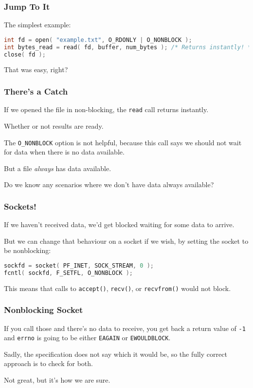 \begin{frame}[fragile]
	\frametitle{Jump To It}

	The simplest example:

	\begin{lstlisting}[language=C]
int fd = open( "example.txt", O_RDONLY | O_NONBLOCK );
int bytes_read = read( fd, buffer, num_bytes ); /* Returns instantly! */
close( fd );
\end{lstlisting}

	That was easy, right?

\end{frame}


\begin{frame}
	\frametitle{There's a Catch}

	If we opened the file in non-blocking, the \texttt{read} call returns instantly.

	Whether or not results are ready.

	The \texttt{O\_NONBLOCK} option is not helpful, because this call says we should not wait for data when there is no data available.

	But a file \textit{always} has data available.

	Do we know any scenarios where we don't have data always available?

\end{frame}


\begin{frame}[fragile]
	\frametitle{Sockets!}

	If we haven't received data, we'd get blocked waiting for some data to arrive.

	But we can change that behaviour on a socket if we wish, by setting the socket to be nonblocking:

	\begin{lstlisting}[language=C]
sockfd = socket( PF_INET, SOCK_STREAM, 0 );
fcntl( sockfd, F_SETFL, O_NONBLOCK );
\end{lstlisting}

	This means that calls to \texttt{accept()}, \texttt{recv()}, or \texttt{recvfrom()} would not block.

\end{frame}

\begin{frame}
	\frametitle{Nonblocking Socket}

	If you call those and there's no data to receive, you get back a return value of \texttt{-1} and \texttt{errno} is going to be either \texttt{EAGAIN} or \texttt{EWOULDBLOCK}.

	Sadly, the specification does not say which it would be, so the fully correct approach is to check for both.

	Not great, but it's how we are sure.

\end{frame}


